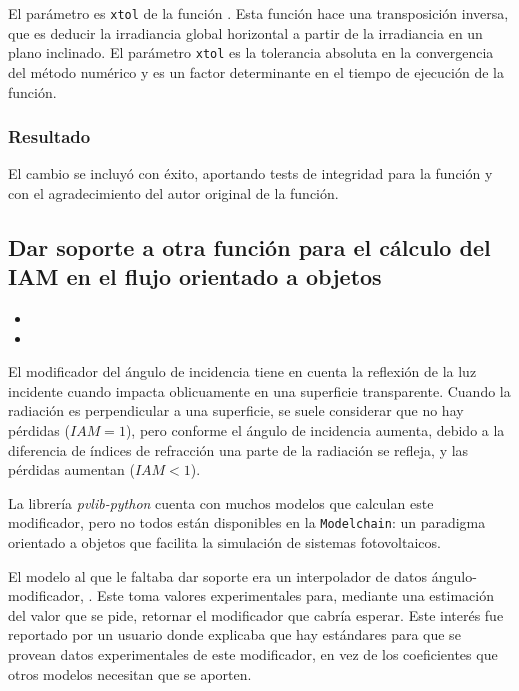 El parámetro es \texttt{xtol} de la función . Esta función hace una transposición inversa, que es deducir la irradiancia global horizontal a partir de la irradiancia en un plano inclinado. El parámetro \texttt{xtol} es la tolerancia absoluta en la convergencia del método numérico y es un factor determinante en el tiempo de ejecución de la función.

\subsubsection{Resultado}

El cambio se incluyó con éxito, aportando tests de integridad para la función y con el agradecimiento del autor original de la función.

\subsection{Dar soporte a otra función para el cálculo del IAM en el flujo orientado a objetos}

\begin{itemize}
    \item {}
    \item {}
\end{itemize}

El modificador del ángulo de incidencia tiene en cuenta la reflexión de la luz incidente cuando impacta oblicuamente en una superficie transparente. Cuando la radiación es perpendicular a una superficie, se suele considerar que no hay pérdidas ($IAM = 1$), pero conforme el ángulo de incidencia aumenta, debido a la diferencia de índices de refracción una parte de la radiación se refleja, y las pérdidas aumentan ($IAM < 1$).

La librería \textit{pvlib-python} cuenta con muchos modelos que calculan este modificador, pero no todos están disponibles en la \texttt{Modelchain}: un paradigma orientado a objetos que facilita la simulación de sistemas fotovoltaicos.

El modelo al que le faltaba dar soporte era un interpolador de datos ángulo-modificador, . Este toma valores experimentales para, mediante una estimación del valor que se pide, retornar el modificador que cabría esperar. Este interés fue reportado por un usuario donde explicaba que hay estándares para que se provean datos experimentales de este modificador, en vez de los coeficientes que otros modelos necesitan que se aporten.


